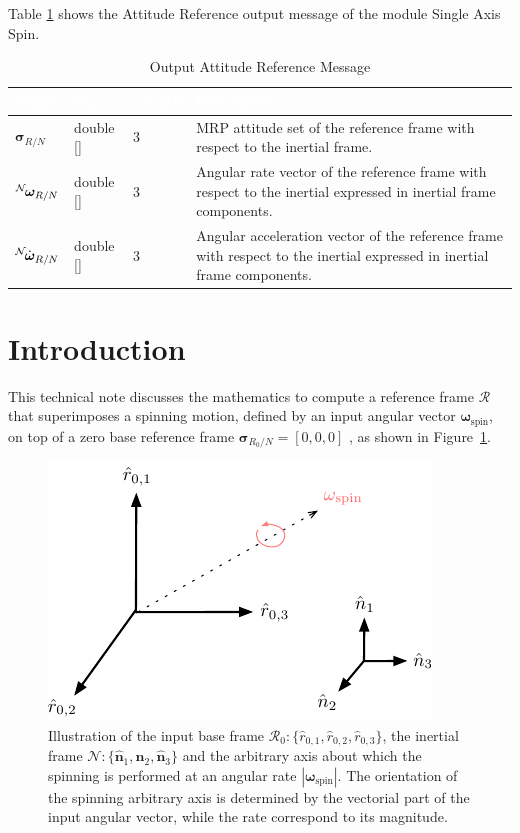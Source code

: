 \documentclass[]{AVSSimReportMemo}
\begin{document}
Table \ref{tab:outputTable} shows the Attitude Reference output message of the module Single Axis Spin.
\begin{table}[h!]
	\centering
	\caption{Output Attitude Reference Message}
	\begin{tabular}{|l|l|l|p{3in}|}
		\hline
		\rowcolor{BrickRed}
		\textcolor{white}{Name} & \textcolor{white}{Type} & 
		\textcolor{white}{Length} & 
		\textcolor{white}{Description}  \\ \hline
		$\bm{\sigma}_{R/N}$ & double [] & 3 & 
		MRP attitude set of the reference frame with respect to the inertial frame. \\ \hline
		$\leftexp{N} {\bm{\omega}_{R/N}}$ & double [] & 3 & 
		Angular rate vector of the reference frame with respect to the inertial expressed in inertial frame components. \\ \hline
		$\leftexp{N} {\dot{\bm{\omega}}_{R/N}}$ & double [] & 3 & 
		Angular acceleration vector of the reference frame with respect to the inertial expressed in inertial frame components. \\ \hline
	\end{tabular}
	\label{tab:outputTable}
\end{table}
\newpage

\section{Introduction}
This technical note discusses the mathematics to compute a reference frame $\mathcal{R}$ that superimposes a spinning motion, defined by an input angular vector $\bm{\omega}_{\textrm{spin}}$, on top of a zero base reference frame $ \bm{\sigma}_{R_0/N} = [0, 0, 0]$ , as shown in Figure~\ref{fig:fig1}.
\begin{figure}[htb]
	\centerline{
	\includegraphics{Figures/fig1}
	}
	\caption{Illustration of the input base frame $\mathcal{R}_{0}:\{ \hat r_{0,1}, \hat r_{0,2}, \hat r_{0,3} \}$,  the inertial frame $\mathcal{N}:\{ \hat{\bm n}_{1}, \hat{\bm n}_{2}, \hat{\bm n}_{3} \}$ and the arbitrary axis about which the spinning is performed at an angular rate  $|\bm{\omega}_{\textrm{spin}}|$. The orientation of the spinning arbitrary axis is determined by the vectorial part of the input angular vector, while the rate correspond to its magnitude.}
	\label{fig:fig1}
\end{figure}
\end{document}
